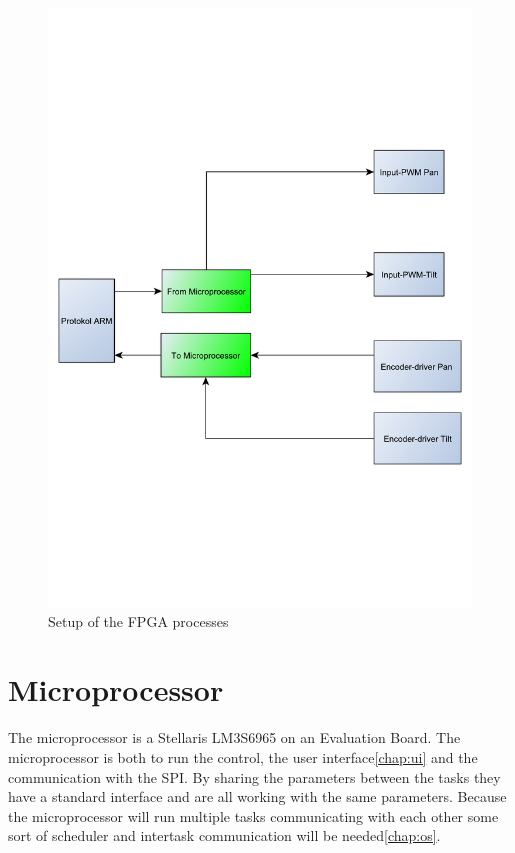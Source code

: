 \begin{figure}[htb]
	\centering
	\includegraphics[scale=0.3,trim=200 200 200 200]{graphics/FPGA} %
	\caption{Setup of the FPGA processes}
	\label{fig:FPGA}			%
\end{figure}

\section{Microprocessor}\label{sec:microprocessor}

The microprocessor is a Stellaris LM3S6965 on an Evaluation Board. The microprocessor is both to run the control, the user interface\ref{chap:ui} and the communication with the SPI. By sharing the parameters between the tasks they have a standard interface and are all working with the same parameters. Because the microprocessor will run multiple tasks communicating with each other some sort of scheduler and intertask communication will be needed\ref{chap:os}.

